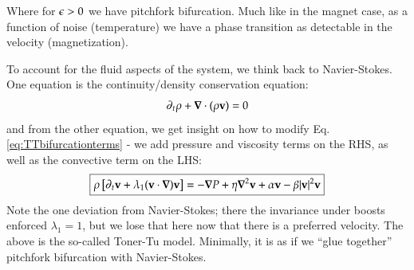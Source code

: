 Where for $\epsilon > 0$ we have pitchfork bifurcation. Much like in the magnet case, as a function of noise (temperature) we have a phase transition as detectable in the velocity (magnetization).

To account for the fluid aspects of the system, we think back to Navier-Stokes. One equation is the continuity/density conservation equation:
\begin{equation}
    \p_t \rho + \nabla \cdot (\rho\v{v}) = 0
\end{equation}
and from the other equation, we get insight on how to modify Eq. \eqref{eq:TTbifurcationterms} - we add pressure and viscosity terms on the RHS, as well as the convective term on the LHS:
\begin{equation}
    \boxed{\rho\left[\p_t \v{v} + \lambda_1(\v{v} \cdot \nabla)\v{v}\right] = -\nabla P + \eta \nabla^2\v{v} + \alpha \v{v} - \beta\abs{\v{v}}^2\v{v}}
\end{equation}
Note the one deviation from Navier-Stokes; there the invariance under boosts enforced $\lambda_1 = 1$, but we lose that here now that there is a preferred velocity. The above is the so-called Toner-Tu model. Minimally, it is as if we ``glue together'' pitchfork bifurcation with Navier-Stokes.